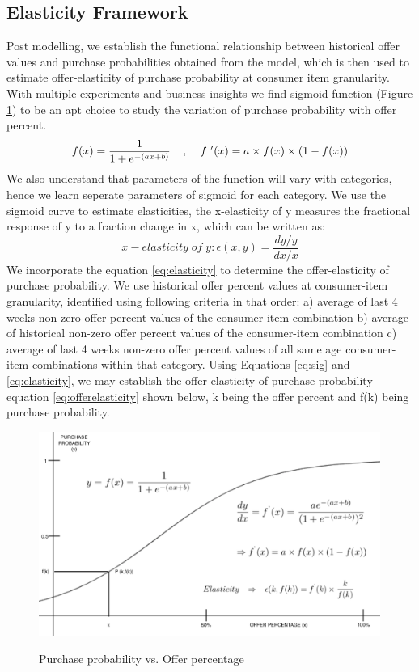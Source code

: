 \subsection{Elasticity Framework}
Post modelling, we establish the functional relationship between historical offer values and purchase
probabilities obtained from the model, which is then used to estimate offer-elasticity of purchase probability at 
consumer item granularity. With multiple experiments and business insights we find sigmoid function (Figure \ref{fig:elasticity}) 
to be an apt choice to study the variation of purchase probability with offer percent. 
\begin{equation}
    f(x) = \frac{1}{1 + e^{-(ax+b)}} \;\;\;\; ,\;\;\;\;
    f\textsuperscript{'}(x) = a\times f(x)\times (1 - f(x))
    \label{eq:sig}
  \end{equation}
We also understand that parameters of the
function will vary with categories, hence we learn seperate parameters of sigmoid for each category.
We use the sigmoid curve to estimate elasticities, the x-elasticity of y measures the fractional response of y to a 
fraction change in x, which can be written as:
\begin{equation}
    x-elasticity \;of\; y: \epsilon(x,y) = \frac{dy/y}{dx/x}
    \label{eq:elasticity}
  \end{equation}
We incorporate the equation \ref{eq:elasticity} to determine the offer-elasticity of purchase probability.
We use historical offer percent values at consumer-item granularity, identified using following criteria
in that order: a) average of last 4 weeks non-zero offer percent values of the consumer-item combination
b) average of historical non-zero offer percent values of the consumer-item combination
c) average of last 4 weeks non-zero offer percent values of all same age consumer-item combinations within that category.
Using Equations \ref{eq:sig} and \ref{eq:elasticity}, we may establish the offer-elasticity of purchase probability
equation \ref{eq:offerelasticity} shown below, k being the offer percent and f(k) being purchase probability.
  \begin{figure}[t]
    \centering 
    \caption{Purchase probability vs. Offer percentage} 
    \includegraphics[width=4.4in]{img/elasticity.png} 
    \label{fig:elasticity} 
  \end{figure}
